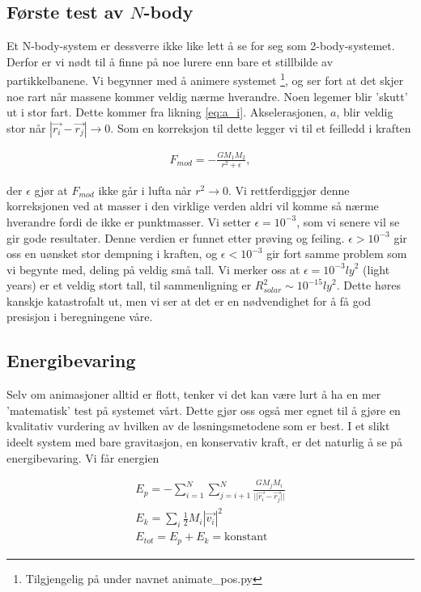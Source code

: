 \documentclass[11pt]{article}
\begin{document}
\begin{multicols}{2}

\subsection{Første test av $N$-body}
\label{sec:forste-test-epsilon}
Et N-body-system er dessverre ikke like lett å se for seg som
2-body-systemet. Derfor er vi nødt til å finne på noe lurere enn
bare et stillbilde av partikkelbanene. Vi begynner med å animere systemet 
\footnote{Tilgjengelig på \cite{github-repo} under navnet
animate\_pos.py}, og ser fort at det skjer noe rart når massene kommer veldig
nærme hverandre. Noen legemer blir 'skutt' ut i stor fart. Dette kommer fra 
likning \eqref{eq:a_i}. Akselerasjonen, $a$, blir veldig
stor når $|\vec{r_i} - \vec{r_j}| \rightarrow 0$.
Som en korreksjon til dette legger vi til et feilledd i kraften

\begin{align}
F_{mod} = -\frac{GM_1M_2}{r^2 + \epsilon},
\end{align}

der $\epsilon$ gjør at $F_{mod}$ ikke går i lufta når $r^2 \rightarrow 0$. Vi 
rettferdiggjør denne korreksjonen ved at masser i den virklige
verden aldri vil komme så nærme hverandre fordi de ikke er punktmasser.
Vi setter $\epsilon = 10^{-3}$, som vi senere vil se gir
gode resultater. Denne verdien er funnet etter prøving og feiling. 
$\epsilon > 10^{-3}$ gir oss en uønsket stor dempning i kraften, og 
$\epsilon < 10^{-3}$ gir fort samme problem som vi begynte med, deling på
veldig små tall. Vi merker oss at $\epsilon = 10^{-3} {ly}^2$ (light years) er et veldig 
stort tall, til sammenligning er $R_{solar}^2 \sim 10^{-15} {ly}^2$. Dette høres kanskje katastrofalt
ut, men vi ser at det er en nødvendighet for å få god presisjon i beregningene våre.

\subsection{Energibevaring}
Selv om animasjoner alltid er flott, tenker vi det kan være lurt å ha en mer
'matematisk' test på systemet vårt. Dette gjør oss også mer egnet til
å gjøre en kvalitativ vurdering av hvilken av de løsningsmetodene som er best.
I et slikt ideelt system med bare 
gravitasjon, en konservativ kraft, er det naturlig å se på energibevaring. Vi får
energien

\begin{align}
E_{p} = - \sum_{i = 1}^{N} \sum_{j = i+1}^{N} \frac{GM_jM_i}{{||\vec{r_i} - \vec{r_j}||}} \\
E_{k} = \sum_{i} \frac{1}{2}M_i|\vec{v_i}|^2 \\
E_{tot} = E_{p} + E_{k} = \text{konstant}
\end{align}


\end{multicols}
\end{document}
